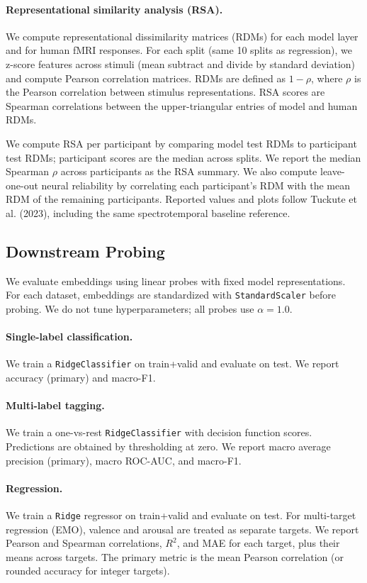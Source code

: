 \paragraph{Representational similarity analysis (RSA).}
We compute representational dissimilarity matrices (RDMs) for each model layer and for human fMRI responses. For each split (same 10 splits as regression), we z-score features across stimuli (mean subtract and divide by standard deviation) and compute Pearson correlation matrices. RDMs are defined as $1 - \rho$, where $\rho$ is the Pearson correlation between stimulus representations. RSA scores are Spearman correlations between the upper-triangular entries of model and human RDMs. 

We compute RSA per participant by comparing model test RDMs to participant test RDMs; participant scores are the median across splits. We report the median Spearman $\rho$ across participants as the RSA summary. We also compute leave-one-out neural reliability by correlating each participant's RDM with the mean RDM of the remaining participants. Reported values and plots follow Tuckute et al. (2023), including the same spectrotemporal baseline reference.

\subsection{Downstream Probing}
We evaluate embeddings using linear probes with fixed model representations. For each dataset, embeddings are standardized with \texttt{StandardScaler} before probing. We do not tune hyperparameters; all probes use $\alpha=1.0$.

\paragraph{Single-label classification.}
We train a \texttt{RidgeClassifier} on train+valid and evaluate on test. We report accuracy (primary) and macro-F1.

\paragraph{Multi-label tagging.}
We train a one-vs-rest \texttt{RidgeClassifier} with decision function scores. Predictions are obtained by thresholding at zero. We report macro average precision (primary), macro ROC-AUC, and macro-F1.

\paragraph{Regression.}
We train a \texttt{Ridge} regressor on train+valid and evaluate on test. For multi-target regression (EMO), valence and arousal are treated as separate targets. We report Pearson and Spearman correlations, $R^2$, and MAE for each target, plus their means across targets. The primary metric is the mean Pearson correlation (or rounded accuracy for integer targets).

